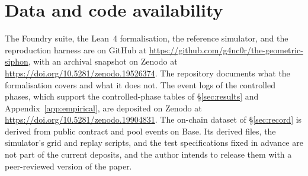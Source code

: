 \documentclass[11pt,a4paper]{article}
\def\UrlBreakPenalty{10000}
\def\UrlBigBreakPenalty{10000}
\theoremstyle{siphon}
\begin{document}
\section*{Data and code availability}

The Foundry suite, the Lean~4 formalisation, the reference simulator, and the reproduction harness are on GitHub at {\def\UrlBreakPenalty{100}\def\UrlBigBreakPenalty{100}\url{https://github.com/g4nc0r/the-geometric-siphon}}, with an archival snapshot on Zenodo at \url{https://doi.org/10.5281/zenodo.19526374}. The repository documents what the formalisation covers and what it does not. The event logs of the controlled phases, which support the controlled-phase tables of \S\ref{sec:results} and Appendix~\ref{app:empirical}, are deposited on Zenodo at \url{https://doi.org/10.5281/zenodo.19904831}. The on-chain dataset of \S\ref{sec:record} is derived from public contract and pool events on Base. Its derived files, the simulator's grid and replay scripts, and the test specifications fixed in advance are not part of the current deposits, and the author intends to release them with a peer-reviewed version of the paper.
\end{document}
